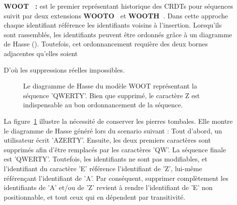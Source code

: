 \begin{itemize}
\item [\textbf{WOOT~\cite{oster2006data} :}] est le premier représentant
  historique des CRDTs pour séquences suivit par deux extensions
  \textbf{WOOTO~\cite{weiss2007wooki}} et
  \textbf{WOOTH~\cite{ahmed2011evaluating}}. Dans cette approche chaque
  identifiant référence les identifiants voisins à l'insertion.  Lorsqu'ils sont
  rassemblés, les identifiants peuvent être ordonnés grâce à un diagramme de
  Hasse (\REF). Toutefois, cet ordonnancement requière des deux bornes
  adjacentes qu'elles soient
  D'où les suppressions réelles impossibles.

  \begin{figure}
    \centering
    
    \caption{\label{repl:fig:wootexample}Le diagramme de Hasse du modèle WOOT
      représentant la séquence 'QWERTY'. Bien que supprimé, le caractère Z est
      indispensable au bon ordonnancement de la séquence.}
  \end{figure}

  La figure~\ref{repl:fig:wootexample} illustre la nécessité de conserver les
  pierres tombales. Elle montre le diagramme de Hasse généré lors du scenario
  suivant : Tout d'abord, un utilisateur écrit 'AZERTY'. Ensuite, les deux
  premiers caractères sont supprimés afin d'être remplacés par les caractères
  'QW'. La séquence finale est 'QWERTY'. Toutefois, les identifiants ne sont pas
  modifiables, et l'identifiant du caractère 'E' référence l'identifiant de 'Z',
  lui-même référençant l'identifiant de 'A'. Par conséquent, supprimer
  complètement les identifiants de 'A' et/ou de 'Z' revient à rendre
  l'identifiant de 'E' non positionnable, et tout ceux qui en dépendent par
  transitivité.


\end{itemize}
